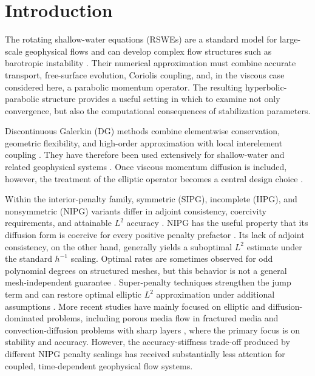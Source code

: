 \documentclass[pdflatex,sn-mathphys-num]{sn-jnl}%
\theoremstyle{thmstyleone}%
\theoremstyle{thmstyletwo}%
\theoremstyle{thmstylethree}%
\begin{document}


\maketitle

\section{Introduction}

The rotating shallow-water equations (RSWEs) are a standard model for large-scale geophysical flows \cite{Pedlosky2013,Williamson1992} and can develop complex
flow structures such as barotropic instability \cite{Galewsky2004}. 
Their numerical approximation must combine accurate transport, free-surface evolution, Coriolis coupling, and, in the viscous case considered here, 
a parabolic momentum operator. The resulting hyperbolic-parabolic structure provides a useful setting in which to examine not only convergence, 
but also the computational consequences of stabilization parameters.

Discontinuous Galerkin (DG) methods combine elementwise conservation, geometric flexibility, and high-order approximation with local interelement 
coupling \cite{Cockburn1990,ref_article3}. They have therefore been used extensively for shallow-water and related geophysical systems 
\cite{ref_article6,ref_article3,ref_article5,ref_article1}. Once viscous momentum diffusion is included, however, the treatment of the 
elliptic operator becomes a central design choice \cite{Baumann1999,Liu2019}.

Within the interior-penalty family, symmetric (SIPG), incomplete (IIPG), and nonsymmetric (NIPG) variants differ in adjoint consistency, coercivity 
requirements, and attainable $L^2$ accuracy \cite{Baumann1999, Epshteyn2007, Hesthaven2007}. NIPG has the useful property that its diffusion 
form is coercive for every positive penalty prefactor \cite{ref_article7,Houston2005,Riviere2001,Hesthaven2007}. Its lack of adjoint consistency, on the other hand, generally yields a suboptimal $L^2$ 
estimate under the standard $h^{-1}$ scaling. Optimal rates are sometimes observed for odd polynomial degrees on structured meshes, but this behavior 
is not a general mesh-independent guarantee \cite{Larson2004,Houston2002}. Super-penalty techniques strengthen the jump term and can restore optimal 
elliptic $L^2$ approximation under additional assumptions \cite{Chen2006,Gudi2009}.
More recent studies have mainly focused on elliptic 
and diffusion-dominated problems, including porous media flow in fractured media \cite{Liu2026} and convection-diffusion problems with sharp layers 
\cite{Zhang2024}, where the primary focus is on stability and accuracy. However, the accuracy-stiffness trade-off produced by different NIPG penalty 
scalings has received substantially less attention for coupled, time-dependent geophysical flow systems.
\end{document}
